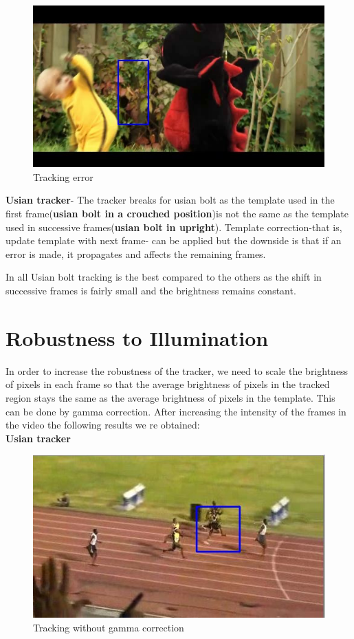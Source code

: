 \documentclass[12pt]{article}
\begin{document}
\begin{figure}[h]
    \centering
    \includegraphics[width=12cm]{trackbaby5}
    \caption{Tracking error}
    \label{fig:Tracking error}
\end{figure}

\textbf{Usian tracker}-
The tracker breaks for usian bolt as the template used in the first frame(\textbf{usian bolt in a crouched position})is not the same as the template used in successive frames(\textbf{usian bolt in upright}). Template correction-that is, update template with next frame- can be applied but the downside is that if an error is made, it propagates and affects the remaining frames.

In all Usian bolt tracking is the best compared to the others as the shift in successive frames is fairly small and the brightness remains constant.

\section{Robustness to Illumination}
In order to increase the robustness of the tracker, we need to scale the brightness of pixels in each frame so that the average brightness of pixels in the tracked region stays the same as the average brightness of pixels in the template. This can be done by gamma correction.
After increasing the intensity of the frames in the video the following results we re obtained:\\
\textbf{Usian tracker}
\begin{figure}[h]
    \centering
    \includegraphics[width=12cm]{boltwithoutgammaa}
    \caption{Tracking without gamma correction}
    \label{fig:Tracking without gamma correction}
\end{figure}
\end{document}
